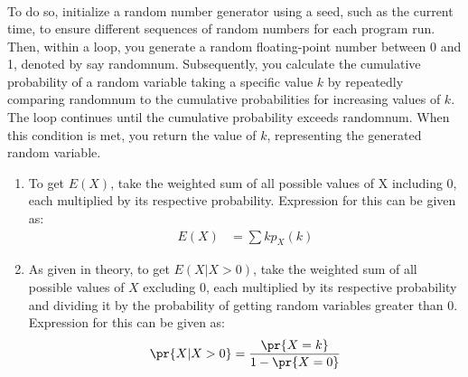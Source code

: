 \documentclass[journal,12pt,onecolumn]{IEEEtran}
\theoremstyle{remark}
\begin{document}
\begin{enumerate}
\begin{align}
\end{align}
To do so, initialize a random number generator using a seed, such as the current time, to ensure different sequences of random numbers for each program run. Then, within a loop, you generate a random floating-point number between 0 and 1, denoted by say randomnum. Subsequently, you calculate the cumulative probability of a random variable taking a specific value $k$ by repeatedly comparing randomnum to the cumulative probabilities for increasing values of $k$. The loop continues until the cumulative probability exceeds randomnum. When this condition is met, you return the value of $k$, representing the generated random variable. 
\begin{enumerate}
	\item To get $E(X)$, take the weighted sum of all possible values of X including $0$, each multiplied by its respective probability. Expression for this can be given as:
\begin{align}
	E(X)&=\sum k p_X(k)
\end{align}
\item As given in theory, to get $E(X|X>0)$, take the weighted sum of all possible values of $X$ excluding $0$, each multiplied by its respective probability and dividing it by the probability of getting random variables greater than $0$. Expression for this can be given as:
\begin{align}
	\pr{X|X>0}&=\frac{\pr{X=k}}{1-\pr{X=0}}\\
\end{align}
\end{enumerate}

\end{enumerate}
\end{document}
